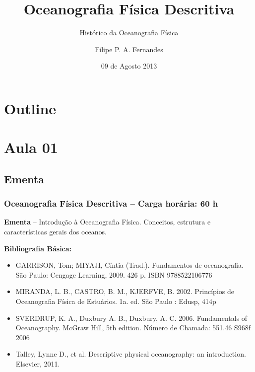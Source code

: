 \title[Aula 01]{Oceanografia Física Descritiva}
\subtitle{Histórico da Oceanografia Física}
\author[Filipe Fernandes]{Filipe P. A. Fernandes}
\date[Agosto 2013]{09 de Agosto 2013}




\begin{frame}[plain]
  \titlepage
\end{frame}

\section*{Outline}
\begin{frame}
\tableofcontents
\end{frame}


\section{Aula 01}
\subsection{Ementa}
\begin{frame}
    \frametitle{Oceanografia Física Descritiva -- Carga horária: 60 h}

    {\bf Ementa} -- Introdução à Oceanografia Física. Conceitos, estrutura e
    características gerais dos oceanos.

    \vspace*{0.5cm}

    {\scriptsize
    {\bf Bibliografia Básica:}
        \begin{itemize}
            \item GARRISON, Tom; MIYAJI, Cíntia (Trad.). Fundamentos de
                oceanografia. São Paulo: Cengage Learning, 2009. 426 p.
                ISBN 9788522106776
            \item MIRANDA, L. B., CASTRO, B. M., KJERFVE, B. 2002. Princípios de
                Oceanografia Física de Estuários. 1a. ed. São Paulo : Edusp, 414p
            \item SVERDRUP, K. A., Duxbury A. B., Duxbury, A. C. 2006. Fundamentals
                of Oceanography. McGraw Hill, 5th edition. Número de Chamada: 551.46 S968f 2006
            \item Talley, Lynne D., et al. Descriptive physical oceanography:
                 an introduction. Elsevier, 2011.
        \end{itemize}
    }
\end{frame}

